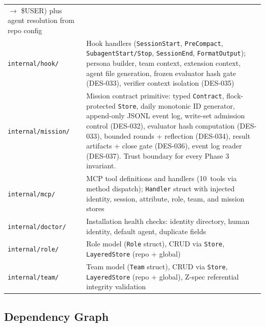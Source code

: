 \documentclass[a4paper,10pt]{article}
\newcommand{\pkg}[1]{\texttt{#1}}
\begin{document}
\begin{center}
\begin{longtable}{@{}lp{8.5cm}@{}}
                          $\to$ \$USER) plus agent resolution from
                          repo config \\
\pkg{internal/hook/}     & Hook handlers (\texttt{SessionStart},
                          \texttt{PreCompact},
                          \texttt{SubagentStart/Stop},
                          \texttt{SessionEnd}, \texttt{FormatOutput});
                          persona builder, team context, extension
                          context, agent file generation, frozen
                          evaluator hash gate (DES-033), verifier
                          context isolation (DES-035) \\
\pkg{internal/mission/}  & Mission contract primitive: typed
                          \texttt{Contract}, flock-protected
                          \texttt{Store}, daily monotonic ID
                          generator, append-only JSONL event log,
                          write-set admission control (DES-032),
                          evaluator hash computation (DES-033),
                          bounded rounds + reflection (DES-034),
                          result artifacts + close gate (DES-036),
                          event log reader (DES-037).  Trust boundary
                          for every Phase 3 invariant. \\
\pkg{internal/mcp/}      & MCP tool definitions and handlers
                          (10~tools via method dispatch);
                          \texttt{Handler} struct with injected
                          identity, session, attribute, role, team,
                          and mission stores \\
\pkg{internal/doctor/}   & Installation health checks: identity
                          directory, human identity, default agent,
                          duplicate fields \\
\pkg{internal/role/}     & Role model (\texttt{Role} struct), CRUD
                          via \texttt{Store}, \texttt{LayeredStore}
                          (repo + global) \\
\pkg{internal/team/}     & Team model (\texttt{Team} struct), CRUD
                          via \texttt{Store}, \texttt{LayeredStore}
                          (repo + global), Z-spec referential
                          integrity validation \\
\bottomrule
\end{longtable}
\end{center}

\subsection{Dependency Graph}
\end{document}
